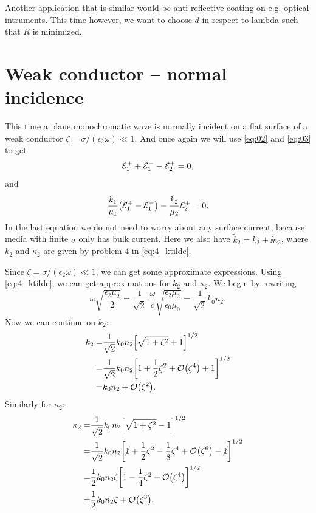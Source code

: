 \documentclass[11pt,letter, swedish, english
]{article}
\begin{document}
Another application that is similar would be anti-reflective coating
on e.g. optical intruments. This time however, we want to
choose $d$ in respect to lambda such that $R$ is minimized. 







\section{Weak conductor -- normal incidence}
\newcommand{\kt}{\tilde{k}}

This time a plane monochromatic wave is normally incident on a flat
surface of a weak conductor $\zeta=\sigma/(\epsilon_2\omega)\ll1$. And
once again we will use \eqref{eq:02} and \eqref{eq:03} to get
\begin{equation}\label{eq:2_BC1}
{\mathcal{E}_1^+}+{\mathcal{E}_1^-} -{\mathcal{E}_2^+} =0, 
\end{equation}
and 
\begin{equation}\label{eq:2_BC2}
\frac{k_1}{\mu_1}\qty(\Ep-\Em) 
-\frac{\kt_2}{\mu_2}\Epp =0.
\end{equation}
In the last equation we do not need to worry about any surface
current, because media with finite $\sigma$ only has bulk
current. Here we also have $\kt_{2} = k_2 + \ii\kappa_2$, where
$k_2$ and $\kappa_2$ are given by problem 4 in \eqref{eq:4_ktilde}.

Since $\zeta=\sigma/(\epsilon_2\omega)\ll1$, we can get some
approximate expressions. Using \eqref{eq:4_ktilde}, we can get
approximations for $k_2$ and $\kappa_2$. We begin by rewriting
\begin{equation}
\omega\sqrt{\frac{\epsilon_2\mu_2}{2}} 
=\frac{1}{\sqrt{2}}\; \frac{\omega}{c} 
\sqrt{\frac{\epsilon_2\mu_2}{\epsilon_0\mu_0}}
=\frac{1}{\sqrt{2}}k_0n_2.
\end{equation}
Now we can continue on $k_2$:
\begin{equation}
\begin{aligned}
k_2 =& \frac{1}{\sqrt{2}}k_0n_2
\qty[\sqrt{1+\zeta^2}+1]^{1/2}\\
=& \frac{1}{\sqrt{2}}k_0n_2
\qty[1+\frac{1}{2}\zeta^2+\order{\zeta^4}+1]^{1/2}\\
=& k_0n_2  +\order{\zeta^2}.
\end{aligned}
\end{equation}
Similarly for $\kappa_2$:
\begin{equation}
\begin{aligned}
\kappa_2 =& \frac{1}{\sqrt{2}}k_0n_2
\qty[\sqrt{1+\zeta^2}-1]^{1/2}\\
=& \frac{1}{\sqrt{2}}k_0n_2
\qty[\cancel{1}+\frac{1}{2}\zeta^2-\frac{1}{8}\zeta^4+
\order{\zeta^6}-\cancel{1}]^{1/2}\\
=& \frac{1}{2}k_0n_2\zeta
\qty[1-\frac{1}{4}\zeta^2+\order{\zeta^4}]^{1/2}\\
=& \frac{1}{2}k_0n_2\zeta +\order{\zeta^3}.
\end{aligned}
\end{equation}
\end{document}
